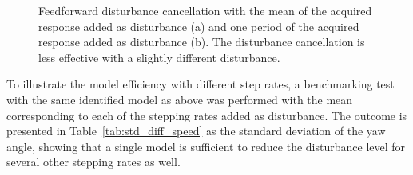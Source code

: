 \begin{figure}[h!]
  \centering %
  \qquad
  \caption{\label{fig:benchmark_dist} Feedforward disturbance cancellation with the mean of the acquired response added as disturbance (a) and one period of the acquired response added as disturbance (b). The disturbance cancellation is less effective with a slightly different disturbance.}
\end{figure}
\FloatBarrier
To illustrate the model efficiency with different step rates, a benchmarking test with the same identified model as above was performed with the mean corresponding to each of the stepping rates added as disturbance. The outcome is presented in Table~\ref{tab:std_diff_speed} as the standard deviation of the yaw angle, showing that a single model is sufficient to reduce the disturbance level for several other stepping rates as well.
